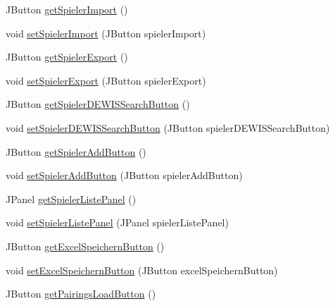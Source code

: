\begin{DoxyCompactItemize}
\item 
J\+Button \hyperlink{classde_1_1turnierverwaltung_1_1view_1_1_navi_view_ae89b3c116cd8747e447bd0b66fb3f2c0}{get\+Spieler\+Import} ()
\item 
void \hyperlink{classde_1_1turnierverwaltung_1_1view_1_1_navi_view_acc924e46906f2ad2aaaca3d3dd0c2166}{set\+Spieler\+Import} (J\+Button spieler\+Import)
\item 
J\+Button \hyperlink{classde_1_1turnierverwaltung_1_1view_1_1_navi_view_a22e904b56508d4b1666ac252a1dc09fb}{get\+Spieler\+Export} ()
\item 
void \hyperlink{classde_1_1turnierverwaltung_1_1view_1_1_navi_view_a76b0687635ca4142eb30e52fca9d80bb}{set\+Spieler\+Export} (J\+Button spieler\+Export)
\item 
J\+Button \hyperlink{classde_1_1turnierverwaltung_1_1view_1_1_navi_view_acaec5609da70ef70d32ce02ccb3aee07}{get\+Spieler\+D\+E\+W\+I\+S\+Search\+Button} ()
\item 
void \hyperlink{classde_1_1turnierverwaltung_1_1view_1_1_navi_view_a7f831b8d9d7277c65dd73753ceca34d8}{set\+Spieler\+D\+E\+W\+I\+S\+Search\+Button} (J\+Button spieler\+D\+E\+W\+I\+S\+Search\+Button)
\item 
J\+Button \hyperlink{classde_1_1turnierverwaltung_1_1view_1_1_navi_view_a3089daf45c67b599bb834347999a0ad1}{get\+Spieler\+Add\+Button} ()
\item 
void \hyperlink{classde_1_1turnierverwaltung_1_1view_1_1_navi_view_a1f82313e3a62ca1dba7b66cb054e6f7b}{set\+Spieler\+Add\+Button} (J\+Button spieler\+Add\+Button)
\item 
J\+Panel \hyperlink{classde_1_1turnierverwaltung_1_1view_1_1_navi_view_a5fe4fc0c5a40efd16ee02b1cf9322eea}{get\+Spieler\+Liste\+Panel} ()
\item 
void \hyperlink{classde_1_1turnierverwaltung_1_1view_1_1_navi_view_aa9e05fcbe4f6f87a45e5054417f4ef44}{set\+Spieler\+Liste\+Panel} (J\+Panel spieler\+Liste\+Panel)
\item 
J\+Button \hyperlink{classde_1_1turnierverwaltung_1_1view_1_1_navi_view_a258e657add0877705ff08cdcb0deb002}{get\+Excel\+Speichern\+Button} ()
\item 
void \hyperlink{classde_1_1turnierverwaltung_1_1view_1_1_navi_view_ad936057065bd6ff88badb6cae8966c8a}{set\+Excel\+Speichern\+Button} (J\+Button excel\+Speichern\+Button)
\item 
J\+Button \hyperlink{classde_1_1turnierverwaltung_1_1view_1_1_navi_view_a1c3d3a2105d0d30e66a68da0aae6318d}{get\+Pairings\+Load\+Button} ()
\item 

\end{DoxyCompactItemize}
